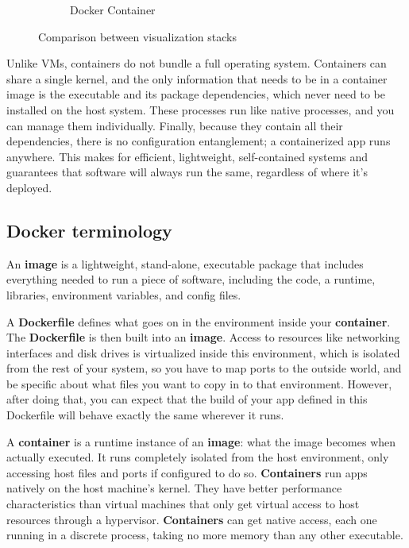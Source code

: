 \documentclass{exam}
\begin{document}
\begin{figure}[!htb]
\begin{subfigure}[!htb]{0.495\textwidth}
        \caption{Docker Container}
        \label{fig:Container}
    \end{subfigure}
	\caption{Comparison between visualization stacks 
    \label{fig:VMvsContainer}}
\end{figure}

Unlike VMs, containers do not bundle a full operating system.
Containers can share a single kernel, and the only information that needs to be in a container image is the executable and its package dependencies, which never need to be installed on the host system.
These processes run like native processes, and you can manage them individually.
Finally, because they contain all their dependencies, there is no configuration entanglement; a containerized app runs anywhere.
This makes for efficient, lightweight, self-contained systems and guarantees that software will always run the same, regardless of where it’s deployed.

\subsection{Docker terminology}

An \textbf{image} is a lightweight, stand-alone, executable package that includes everything needed to run a piece of software, including the code, a runtime, libraries, environment variables, and config files.

A \textbf{Dockerfile} defines what goes on in the environment inside your \textbf{container}.
The \textbf{Dockerfile} is then built into an \textbf{image}.
Access to resources like networking interfaces and disk drives is virtualized inside this environment, which is isolated from the rest of your system, so you have to map ports to the outside world, and be specific about what files you want to copy in to that environment.
However, after doing that, you can expect that the build of your app defined in this Dockerfile will behave exactly the same wherever it runs.

A \textbf{container} is a runtime instance of an \textbf{image}: what the image becomes when actually executed.
It runs completely isolated from the host environment, only accessing host files and ports if configured to do so.
\textbf{Containers} run apps natively on the host machine’s kernel.
They have better performance characteristics than virtual machines that only get virtual access to host resources through a hypervisor.
\textbf{Containers} can get native access, each one running in a discrete process, taking no more memory than any other executable.
\end{document}
